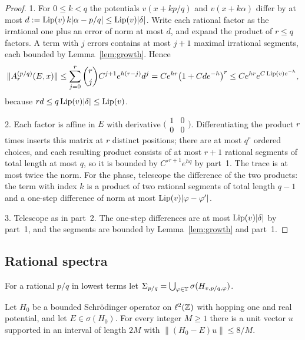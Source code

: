 \begin{proof}
1. For $0\le k<q$ the potentials $v(x+kp/q)$ and $v(x+k\alpha)$ differ by at most $d:=\operatorname{Lip}(v)\,k|\alpha-p/q|\le\operatorname{Lip}(v)|\delta|$. Write each rational factor as the irrational one plus an error of norm at most $d$, and expand the product of $r\le q$ factors. A term with $j$ errors contains at most $j+1$ maximal irrational segments, each bounded by Lemma~\ref{lem:growth}. Hence
\[
\|A^{(p/q)}_r(E,x)\|\le\sum_{j=0}^r\binom rj C^{j+1}e^{h(r-j)}d^j=Ce^{hr}\bigl(1+Cde^{-h}\bigr)^r\le Ce^{hr}e^{C\operatorname{Lip}(v)e^{-h}},
\]
because $rd\le q\operatorname{Lip}(v)|\delta|\le\operatorname{Lip}(v)$.

2. Each factor is affine in $E$ with derivative $\bigl(\begin{smallmatrix}1&0\\0&0\end{smallmatrix}\bigr)$. Differentiating the product $r$ times inserts this matrix at $r$ distinct positions; there are at most $q^r$ ordered choices, and each resulting product consists of at most $r+1$ rational segments of total length at most $q$, so it is bounded by $C'^{r+1}e^{hq}$ by part~1. The trace is at most twice the norm. For the phase, telescope the difference of the two products: the term with index $k$ is a product of two rational segments of total length $q-1$ and a one-step difference of norm at most $\operatorname{Lip}(v)|\varphi-\varphi'|$.

3. Telescope as in part~2. The one-step differences are at most $\operatorname{Lip}(v)|\delta|$ by part~1, and the segments are bounded by Lemma~\ref{lem:growth} and part~1.
\end{proof}

\subsection{Rational spectra}

For a rational $p/q$ in lowest terms let $\Sigma_{p/q}=\bigcup_{\varphi\in\mathbb T}\sigma(H_{v,p/q,\varphi})$.

\begin{lemma}\label{lem:window}
Let $H_0$ be a bounded Schr\"odinger operator on $\ell^2(\mathbb Z)$ with hopping one and real potential, and let $E\in\sigma(H_0)$. For every integer $M\ge1$ there is a unit vector $u$ supported in an interval of length $2M$ with $\|(H_0-E)u\|\le 8/M$.
\end{lemma}

